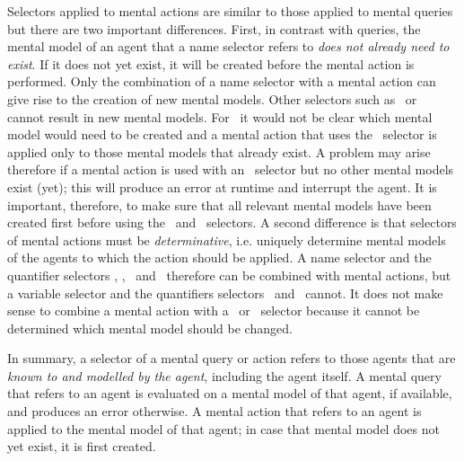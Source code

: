 \documentclass{article}
\begin{document}
Selectors applied to mental actions are similar to those applied to mental queries but there are two important differences. First, in contrast with queries, the mental model of an agent that a name selector refers to \textit{does not already need to exist}. If it does not yet exist, it will be created before the mental action is performed. Only the combination of a name selector with a mental action can give rise to the creation of new mental models. Other selectors such as \somep\, or \allp\, cannot result in new mental models. For \somep\, it  would not be clear which mental model would need to be created and a mental action that uses the \allp\, selector  is applied only to those mental models that already exist. A problem may arise therefore if a mental action is used with an \allother\, selector but no other mental models exist (yet); this will produce an error at runtime and interrupt the agent. It is important, therefore, to make sure that all relevant mental models have been created first before using the \allp\, and \allother\, selectors. A second difference is that selectors of mental actions must be \textit{determinative}, i.e. uniquely determine mental models of the agents to which the action should be applied. A name selector and the quantifier selectors \self, \this, \allp\, and \allother\, therefore can be combined with mental actions, but a variable selector and the quantifiers selectors \somep\, and \someother\, cannot. It does not make sense to combine a mental action with a \somep\, or \someother\, selector because it cannot be determined which mental model should be changed.

In summary, a selector of a mental query or action refers to those agents that are \textit{known to and modelled by the agent}, including the agent itself. A mental query that refers to an agent is evaluated on a mental model of that agent, if available, and produces an error otherwise. A mental action that refers to an agent is applied to the mental model of that agent; in case that mental model does not yet exist, it is first created.
\\[2ex]
\end{document}
